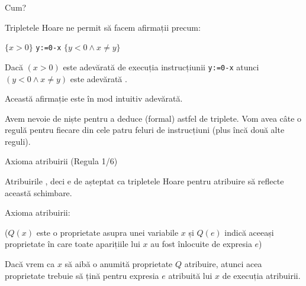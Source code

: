 \begin{frame}{Cum?}

\vspace{-.6cm}
\begin{example}
\smallskip
Tripletele Hoare ne permit să facem afirmații precum:
\vspace{-.2cm}
\begin{center}
$\{x>0\}$ \texttt{y:=0-x} $\{y < 0 \wedge x \neq y\}$
\end{center}
\pause
Dacă $(x > 0)$ este adevărată  de execuția instrucțiunii \texttt{y:=0-x}
atunci $(y < 0 \wedge x \neq y)$ este adevărată . 

\pause
Această afirmație este în mod intuitiv adevărată.
\end{example}

\medskip \pause

Avem nevoie de niște  pentru a deduce (formal) astfel de triplete.
Vom avea câte o regulă pentru fiecare din cele patru feluri de instrucțiuni (plus încă două alte reguli).
\end{frame}


\begin{frame}{Axioma atribuirii (Regula 1/6)}

Atribuirile , deci e de așteptat ca tripletele Hoare pentru atribuire să reflecte această schimbare.

\medskip \pause
\alert{Axioma atribuirii:} 
\begin{center}
\end{center}
{\footnotesize
($Q(x)$ este o proprietate asupra unei variabile $x$ și $Q(e)$ indică aceeași proprietate în care toate aparițiile lui $x$ au fost înlocuite de expresia $e$)
}

\medskip \pause
Dacă vrem ca $x$ să aibă o anumită proprietate $Q$  atribuire, atunci acea proprietate trebuie să țină pentru expresia $e$ atribuită lui $x$  de execuția atribuirii.
\end{frame}



